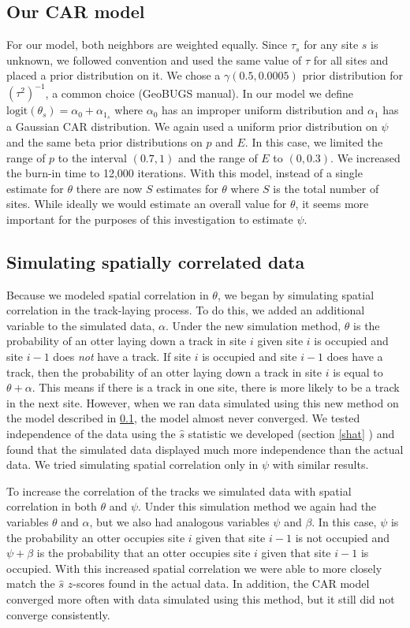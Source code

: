 \documentclass[12pt]{article}
\begin{document}
\subsection{Our CAR model}\label{car model}
For our model, both neighbors are weighted equally. Since $\tau_s$ for any site 
$s$ is unknown, we followed convention and used the same value of $\tau$ for all 
sites and placed a prior distribution on it. We chose a $\gamma(0.5,0.0005)$ 
prior distribution for $(\tau^2)^{-1}$, a common choice (GeoBUGS manual). In our 
model we define $\text{logit}(\theta_s)=\alpha_0+\alpha_{1_s}$ where $\alpha_0$ 
has an improper uniform distribution and $\alpha_1$ has a Gaussian CAR 
distribution. We again used a uniform prior distribution on $\psi$ and the same 
beta prior distributions on $p$ and $E$. In this case, we limited the range of 
$p$ to the interval $(0.7,1)$ and the range of $E$ to $(0,0.3)$. We increased 
the burn-in time to 12,000 iterations. With this model, instead of a single 
estimate for $\theta$ there are now $S$ estimates for $\theta$ where $S$ is the 
total number of sites. While ideally we would estimate an overall value for $
\theta$, it seems more important for the purposes of this investigation to 
estimate $\psi$.

\subsection{Simulating spatially correlated data}
Because we modeled spatial correlation in $\theta$, we began by simulating 
spatial correlation in the track-laying process. To do this, we added an 
additional variable to the simulated data, $\alpha$. Under the new simulation 
method, $\theta$ is the probability of an otter laying down a track in site $i$ 
given site $i$ is occupied and site $i-1$ does \textit{not} have a track. If 
site $i$ is occupied and site $i-1$ does have a track, then the probability of 
an otter laying down a track in site $i$ is equal to $\theta+\alpha$. This means 
if there is a track in one site, there is more likely to be a track in the next site. However, when we ran data simulated using this new method on the model 
described in \ref{car model}, the model almost never converged. We tested 
independence of the data using the $\hat{s}$ statistic we developed (section %
\ref{shat}
) and found that the simulated data displayed much more independence than the 
actual data. We tried simulating spatial correlation only in $\psi$ with similar 
results.

To increase the correlation of the tracks we simulated data with spatial 
correlation in both $\theta$ and $\psi$. Under this simulation method we again 
had the variables $\theta$ and $\alpha$, but we also had analogous variables $
\psi$ and $\beta$. In this case, $\psi$ is the probability an otter occupies 
site $i$ given that site $i-1$ is not occupied and $\psi+\beta$ is the 
probability that an otter occupies site $i$ given that site $i-1$ is occupied. 
With this increased spatial correlation we were able to more closely match the $
\hat{s}$ $z$-scores found in the actual data. In addition, the CAR model 
converged more often with data simulated using this method, but it still did not 
converge consistently. 
\end{document}
